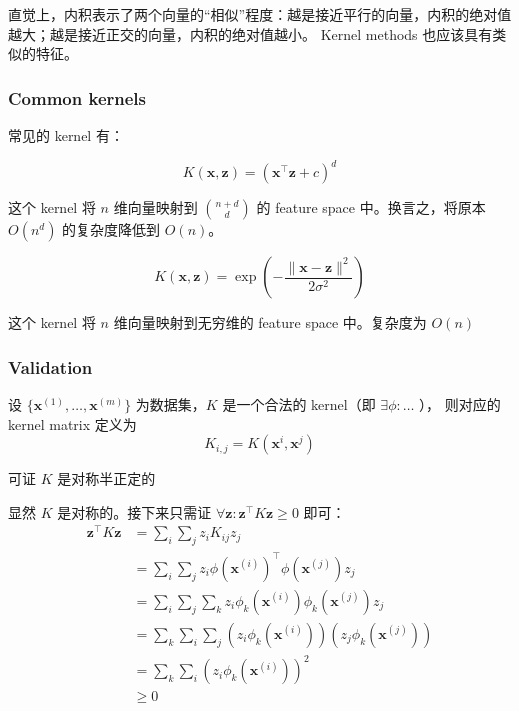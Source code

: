 	直觉上，内积表示了两个向量的“相似”程度：越是接近平行的向量，内积的绝对值越大；越是接近正交的向量，内积的绝对值越小。
	Kernel methods 也应该具有类似的特征。
	
		\subsubsection{Common kernels}
		常见的 kernel 有：
		
		\begin{df}
			\begin{equation}
				K(\bm{x}, \bm{z}) = ( \bm{x}^\intercal \bm{z} + c )^d
			\end{equation}
		\end{df}
		这个 kernel 将 $ n $ 维向量映射到 $ \binom{n+d}{d} $ 的 feature space 中。换言之，将原本 $ O(n^d) $ 的复杂度降低到 $ O(n) $。
		
		\begin{df}
			\begin{equation}
				K(\bm{x}, \bm{z}) = \exp\left( - \frac{ \| \bm{x} - \bm{z} \|^2 }{2 \sigma^2} \right)
			\end{equation}
		\end{df}
		这个 kernel 将 $ n $ 维向量映射到无穷维的 feature space 中。复杂度为 $ O(n) $
		
		\subsubsection{Validation}
		\begin{df}
			设 $ \{ \bm{x}^{(1)}, \ldots, \bm{x}^{(m)} \} $ 为数据集，$ K $ 是一个合法的 kernel（即 $ \exists \phi: \ldots $ ），
			则对应的 kernel matrix 定义为
			\begin{equation*}
				K_{i,j} = K(\bm{x}^i, \bm{x}^j)
			\end{equation*}
		\end{df}
		
		可证 $ K $ 是对称半正定的
		\begin{pf}
			显然 $ K $ 是对称的。接下来只需证 $ \forall \bm{z}: \bm{z}^\intercal K \bm{z} \geq 0 $ 即可：
			\begin{align*}
				\bm{z}^\intercal K \bm{z} &= \sum_i \sum_j z_i K_{ij} z_j \\
				&= \sum_i \sum_j z_i \phi(\bm{x}^{(i)})^\intercal \phi(\bm{x}^{(j)}) z_j \\
				&= \sum_i \sum_j \sum_k z_i \phi_k(\bm{x}^{(i)}) \phi_k(\bm{x}^{(j)}) z_j \\
				&= \sum_k \sum_i \sum_j (z_i \phi_k(\bm{x}^{(i)})) (z_j \phi_k(\bm{x}^{(j)})) \\
				&= \sum_k \sum_i ( z_i \phi_k(\bm{x}^{(i)}) )^2 \\
				&\geq 0
			\end{align*}
		\end{pf}
		
